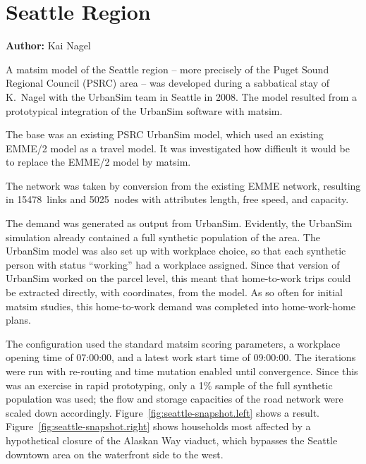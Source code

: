 \section{Seattle Region}
\label{sec:seattle}
\hfill \textbf{Author:} Kai Nagel

A \acrshort{matsim} model of the Seattle region -- more precisely of the Puget Sound Regional Council (PSRC) area -- was developed during a sabbatical stay of K.\ Nagel with the UrbanSim team in Seattle in 2008. The model resulted from a prototypical integration of the UrbanSim software \citep[e.g.][]{WaddellEtc2003UrbanSim} with \acrshort{matsim}. 

The base was an existing PSRC UrbanSim model, which used an existing EMME/2 model    as a travel model. It was investigated how difficult it would be to replace the EMME/2 model by \acrshort{matsim}. 

The network was taken by conversion from the existing EMME network, resulting in 15478~links and 5025~nodes with attributes length, free speed, and capacity.

The demand was generated as output from UrbanSim. Evidently, the UrbanSim simulation already contained a full synthetic population of the area. The UrbanSim model was also set up with workplace choice, so that each synthetic person with status ``working'' had a workplace assigned. Since that version of UrbanSim worked on the parcel level, this meant that home-to-work trips could be extracted directly, with coordinates, from the model. As so often for initial \acrshort{matsim} studies, this home-to-work demand was completed into home-work-home plans.

The configuration used the standard \acrshort{matsim} scoring parameters, a workplace opening time of 07:00:00, and a latest work start time of 09:00:00. The iterations were run with re-routing and time mutation enabled until convergence. Since this was an exercise in rapid prototyping, only a 1\% sample of the full synthetic population was used; the flow and storage capacities of the road network were scaled down accordingly. Figure~\ref{fig:seattle-snapshot.left} shows a result. Figure~\ref{fig:seattle-snapshot.right} shows households most affected by a hypothetical closure of the Alaskan Way viaduct, which bypasses the Seattle downtown area on the waterfront side to the west.

